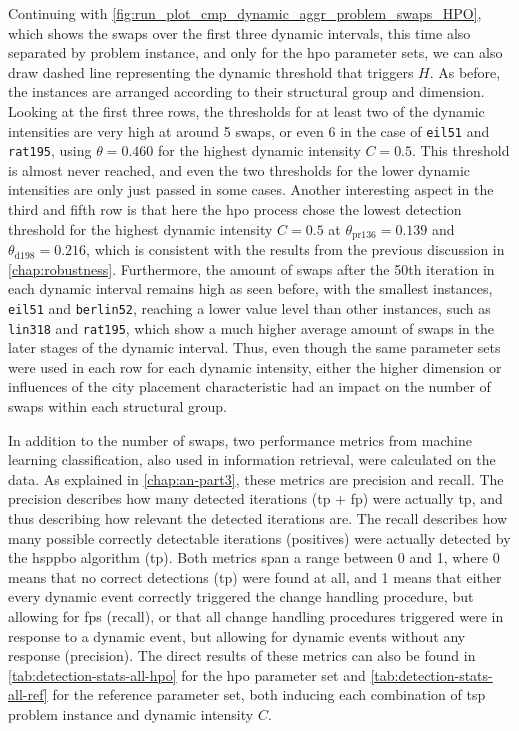 Continuing with \cref{fig:run_plot_cmp_dynamic_aggr_problem_swaps_HPO}, which shows the swaps over the first three dynamic intervals, this time also separated by problem instance, and only for the \gls{hpo} parameter sets, we can also draw dashed line representing the dynamic threshold that triggers $H$. As before, the instances are arranged according to their structural group and dimension. 
Looking at the first three rows, the thresholds for at least two of the dynamic intensities are very high at around 5 swaps, or even 6 in the case of \texttt{eil51} and \texttt{rat195}, using $\theta = 0.460$ for the highest dynamic intensity $C=0.5$. This threshold is almost never reached, and even the two thresholds for the lower dynamic intensities are only just passed in some cases. Another interesting aspect in the third and fifth row is that here the \gls{hpo} process chose the lowest detection threshold for the highest dynamic intensity $C=0.5$ at $\theta_\text{pr136} = 0.139$ and $\theta_\text{d198} =  0.216$, which is consistent with the results from the previous discussion in \cref{chap:robustness}. 
Furthermore, the amount of swaps after the 50th iteration in each dynamic interval remains high as seen before, with the smallest instances, \texttt{eil51} and \texttt{berlin52}, reaching a lower value level than other instances, such as \texttt{lin318} and \texttt{rat195}, which show a much higher average amount of swaps in the later stages of the dynamic interval. Thus, even though the same parameter sets were used in each row for each dynamic intensity, either the higher dimension or influences of the city placement characteristic had an impact on the number of swaps within each structural group.


In addition to the number of swaps, two performance metrics from machine learning classification, also used in information retrieval, were calculated on the data. As explained in \cref{chap:an-part3}, these metrics are precision and recall. The precision describes how many detected iterations (\gls{tp} + \gls{fp}) were actually \gls{tp}, and thus describing how relevant the detected iterations are. The recall describes how many possible correctly detectable iterations (positives) were actually detected by the \gls{hsppbo} algorithm (\gls{tp}). Both metrics span a range between 0 and 1, where 0 means that no correct detections (\gls{tp}) were found at all, and 1 means that either every dynamic event correctly triggered the change handling procedure, but allowing for \glspl{fp} (recall), or that all change handling procedures triggered were in response to a dynamic event, but allowing for dynamic events without any response (precision). The direct results of these metrics can also be found in \cref{tab:detection-stats-all-hpo} for the \gls{hpo} parameter set and \cref{tab:detection-stats-all-ref} for the reference parameter set, both inducing each combination of \gls{tsp} problem instance and dynamic intensity $C$.

